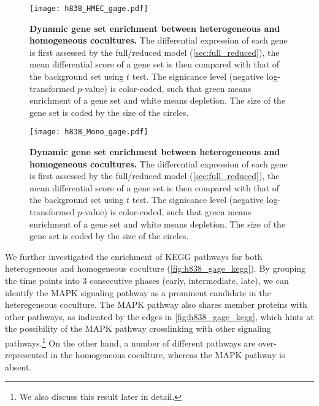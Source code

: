 \begin{figure}[!ht]
\begin{center}
\texttt{[image: h838\_HMEC\_gage.pdf]}
\end{center}
\caption[Dynamic gene set enrichment]{
{\bf Dynamic gene set enrichment between heterogeneous and homogeneous 
cocultures.} 
The differential expression of each gene is first assessed by the full/reduced
model (\ref{sec:full_reduced}), the mean differential score of a gene set
is then compared with that of the background set using $t$ test.
The signicance level (negative log-transformed $p$-value) is color-coded, such
that green means enrichment of a gene set and white means depletion. The size
of the gene set is coded by the size of the circles.
}
\label{fig:h838_hetero_gage}
\end{figure}

\begin{figure}[!ht]
\begin{center}
\texttt{[image: h838\_Mono\_gage.pdf]}
\end{center}
\caption[Dynamic gene set enrichment]{
{\bf Dynamic gene set enrichment between heterogeneous and homogeneous 
cocultures.} 
The differential expression of each gene is first assessed by the full/reduced
model (\ref{sec:full_reduced}), the mean differential score of a gene set
is then compared with that of the background set using $t$ test.
The signicance level (negative log-transformed $p$-value) is color-coded, such
that green means enrichment of a gene set and white means depletion. The size
of the gene set is coded by the size of the circles.
}
\label{fig:h838_homo_gage}
\end{figure}

We further investigated
the enrichment of KEGG pathways for both heterogeneous and homogeneous 
coculture (\ref{fig:h838_gage_kegg}). By grouping the time points into 3 
consecutive phases (early,
intermediate, late), we can identify the MAPK signaling pathway as a prominent 
candidate in the heteregeneous coculture. The MAPK pathway also shares 
member proteins with other pathways, as indicated by the edges in 
\ref{fig:h838_gage_kegg}, which hints at the possibility of the MAPK pathway
crosslinking with other signaling pathways.\footnote{We also discuss this
result later in detail.} On the other hand, a number of different pathways 
are over-represented in the homogeneous coculture, whereas the MAPK
pathway is absent.

